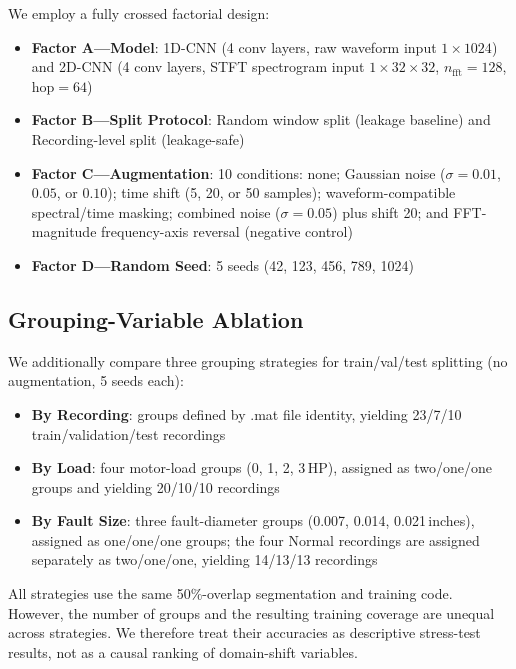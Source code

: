 ﻿\documentclass[11pt,a4paper]{article}
\begin{document}
We employ a fully crossed factorial design:

\begin{itemize}[nosep]
    \item \textbf{Factor A---Model}: 1D-CNN (4 conv layers, raw waveform input $1\times1024$) and 2D-CNN (4 conv layers, STFT spectrogram input $1\times32\times32$, $n_{\text{fft}}=128$, $\text{hop}=64$)
    \item \textbf{Factor B---Split Protocol}: Random window split (leakage baseline) and Recording-level split (leakage-safe)
    \item \textbf{Factor C---Augmentation}: 10 conditions:\newline
    none; Gaussian noise ($\sigma=0.01$, $0.05$, or $0.10$); time shift (5, 20, or 50 samples); waveform-compatible spectral/time masking; combined noise ($\sigma=0.05$) plus shift 20; and FFT-magnitude frequency-axis reversal (negative control)
    \item \textbf{Factor D---Random Seed}: 5 seeds (42, 123, 456, 789, 1024)
\end{itemize}

\subsection{Grouping-Variable Ablation}

We additionally compare three grouping strategies for train/val/test splitting (no augmentation, 5 seeds each):

\begin{itemize}[nosep]
    \item \textbf{By Recording}: groups defined by .mat file identity, yielding 23/7/10 train/validation/test recordings
    \item \textbf{By Load}: four motor-load groups (0, 1, 2, 3\,HP), assigned as two/one/one groups and yielding 20/10/10 recordings
    \item \textbf{By Fault Size}: three fault-diameter groups (0.007, 0.014, 0.021\,inches), assigned as one/one/one groups; the four Normal recordings are assigned separately as two/one/one, yielding 14/13/13 recordings
\end{itemize}

All strategies use the same 50\%-overlap segmentation and training code. However,
the number of groups and the resulting training coverage are unequal across
strategies. We therefore treat their accuracies as descriptive stress-test
results, not as a causal ranking of domain-shift variables.
\end{document}
